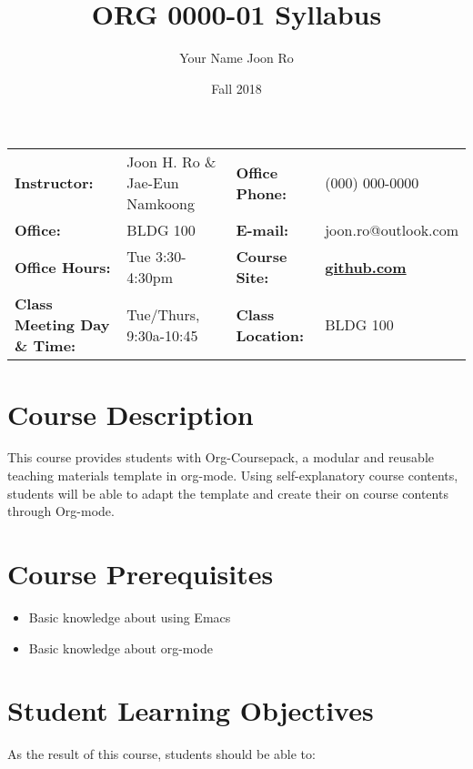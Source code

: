 \documentclass[article,letterpaper,times,10pt,listings-bw,microtype]{scrartcl}
\author{Your Name Joon Ro}
\date{Fall 2018}
\title{ORG 0000-01 Syllabus}
\begin{document}

\begin{center}
{}
\end{center}

\begin{center}
{}
\end{center}

\vspace{5 mm}

\begin{center}
\begin{tabular}{llll}
\textbf{Instructor:} & Joon H. Ro \& Jae-Eun Namkoong & \textbf{Office Phone:} & (000) 000-0000\\
\textbf{Office:} & BLDG 100 & \textbf{E-mail:} & joon.ro@outlook.com\\
\textbf{Office Hours:} & Tue 3:30-4:30pm & \textbf{Course Site:} & \textbf{\href{https://github.com}{github.com}}\\
\textbf{Class Meeting Day \& Time:} & Tue/Thurs, 9:30a-10:45 & \textbf{Class Location:} & BLDG 100\\
\end{tabular}
\end{center}
\section*{Course Description}
\label{sec:org152bfa9}
This course provides students with Org-Coursepack, a modular and reusable
teaching materials template in org-mode. Using self-explanatory course
contents, students will be able to adapt the template and create their on
course contents through Org-mode.
\section*{Course Prerequisites}
\label{sec:org5f9e5f2}
\begin{itemize}
\item Basic knowledge about using Emacs
\item Basic knowledge about org-mode
\end{itemize}
\section*{Student Learning Objectives}
\label{sec:org6c61b70}
As the result of this course, students should be able to:
\end{document}
